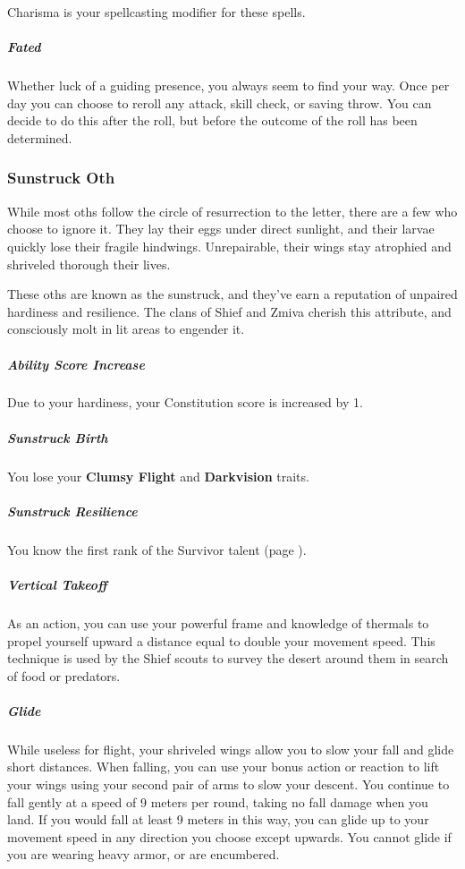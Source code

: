 \begin{linenumbers}
Charisma is your spellcasting modifier for these spells.

\subparagraph{Fated} Whether luck of a guiding presence, you always seem to find your way.
Once per day you can choose to reroll any attack, skill check, or saving throw.
You can decide to do this after the roll, but before the outcome of the roll has been determined.

\subsubsection{Sunstruck Oth} %
While most oths follow the circle of resurrection to the letter, there are a few who choose to ignore it.
They lay their eggs under direct sunlight, and their larvae quickly lose their fragile hindwings.
Unrepairable, their wings stay atrophied and shriveled thorough their lives.

These oths are known as the sunstruck, and they've earn a reputation of unpaired hardiness and resilience.
The clans of Shief and Zmiva cherish this attribute, and consciously molt in lit areas to engender it.

\subparagraph{Ability Score Increase} Due to your hardiness, your Constitution score is increased by 1.

\subparagraph{Sunstruck Birth} You lose your \textbf{Clumsy Flight} and \textbf{Darkvision} traits.

\subparagraph{Sunstruck Resilience} You know the first rank of the Survivor talent (page \pageref{tal::survivor}).

\subparagraph{Vertical Takeoff} As an action, you can use your powerful frame and knowledge of thermals to propel yourself upward a distance equal to double your movement speed.
This technique is used by the Shief scouts to survey the desert around them in search of food or predators.

\subparagraph{Glide} While useless for flight, your shriveled wings allow you to slow your fall and glide short distances.
When falling, you can use your bonus action or reaction to lift your wings using your second pair of arms to slow your descent.
You continue to fall gently at a speed of 9 meters per round, taking no fall damage when you land.
If you would fall at least 9 meters in this way, you can glide up to your movement speed in any direction you choose except upwards.
You cannot glide if you are wearing heavy armor, or are encumbered.
\end{linenumbers}

